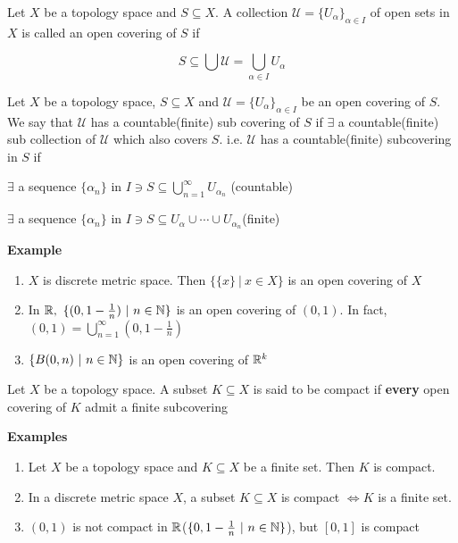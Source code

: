 \begin{defn}
	Let $X$ be a topology space and $S \subseteq X$. A collection $\mathscr{U} = \{U_{\alpha}\}_{\alpha \in I}$ of open sets in $X$ is called an open covering of $S$ if 
	
	$$S \subseteq \bigcup \mathscr{U} = \bigcup_{\alpha \in I}U_{\alpha} $$
\end{defn}

\begin{defn}
	Let $X$ be a topology space, $S \subseteq X$ and $\mathscr{U} = \{U_{\alpha}\}_{\alpha \in I}$ be an open covering of $S$. We say that $\mathscr{U}$ has a countable(finite) sub covering of $S$ if $\exists$ a countable(finite) sub collection of $\mathscr{U}$ which also covers $S$. i.e. $\mathscr{U}$ has a countable(finite) subcovering in $S$ if 
	
	$\exists$ a sequence $\{\alpha_n\}$ in $I \ni S \subseteq \bigcup_{n=1}^{\infty}U_{\alpha_n}$ (countable)
	
	$\exists$ a sequence $\{\alpha_n\}$ in $I \ni S \subseteq U_{\alpha} \cup \cdots \cup U_{\alpha_n}$(finite)
\end{defn}

\textbf{Example} 

\begin{enumerate}
	\item $X$ is discrete metric space. Then $\{\{x\}~|~x \in X\}$ is an open covering of $X$
	\item In $\mathbb{R},~\{(0,1-\frac{1}{n})~|~n \in \mathbb{N}\}$ is an open covering of $(0,1)$. In fact, $(0,1) = \bigcup^{\infty}_{n=1}(0,1-\frac{1}{n})$
	\item $\{B(0,n)~|~n \in \mathbb{N}\}$ is an open covering of $\mathbb{R}^k$
\end{enumerate}

\begin{defn}[compact]
	Let $X$ be a topology space. A subset $K \subseteq X$ is said to be compact if \textbf{every} open covering of $K$ admit a finite subcovering
\end{defn}

\textbf{Examples}

\begin{enumerate}[wide]
	\item Let $X$ be a topology space and $K \subseteq X$ be a finite set. Then $K$ is compact.
	\item In a discrete metric space $X$, a subset $K \subseteq X$ is compact $\Leftrightarrow K$ is a finite set.
	\item $(0,1)$ is not compact in $\mathbb{R}$($\{0,1-\frac{1}{n}~|~n\in \mathbb{N}\}$), but $[0,1]$ is compact
\end{enumerate}

